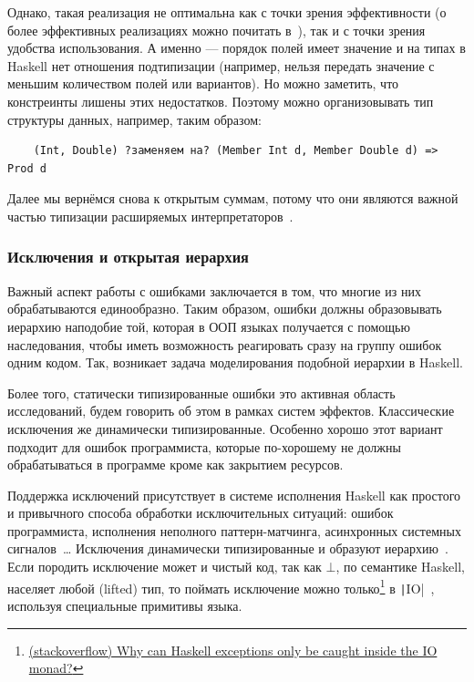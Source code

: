 Однако, такая реализация не оптимальна как с точки зрения эффективности (о более эффективных реализациях можно почитать в~\cite[глава 11]{maguire-types}), так и с точки зрения удобства использования.
А именно --- порядок полей имеет значение и на типах в Haskell нет отношения подтипизации (например, нельзя передать значение с меньшим количеством полей или вариантов).
Но можно заметить, что констреинты лишены этих недостатков.
Поэтому можно организовывать тип структуры данных, например, таким образом:
\begin{verbatim}
    (Int, Double) ?заменяем на? (Member Int d, Member Double d) => Prod d
\end{verbatim}

Далее мы вернёмся снова к открытым суммам, потому что они являются важной частью типизации расширяемых интерпретаторов~\cite{swierstra2008data}. %

\subsubsection{Исключения и открытая иерархия}

Важный аспект работы с ошибками заключается в том, что многие из них обрабатываются единообразно.
Таким образом, ошибки должны образовывать иерархию наподобие той, которая в ООП языках получается с помощью наследования, чтобы иметь возможность реагировать сразу на группу ошибок одним кодом.
Так, возникает задача моделирования подобной иерархии в Haskell.

Более того, статически типизированные ошибки это активная область исследований, будем говорить об этом в рамках систем эффектов. %
Классические исключения же динамически типизированные.
Особенно хорошо этот вариант подходит для ошибок программиста, которые по-хорошему не должны обрабатываться в программе кроме как закрытием ресурсов. %

Поддержка исключений присутствует в системе исполнения Haskell как простого и привычного способа обработки исключительных ситуаций: ошибок программиста, исполнения неполного паттерн-матчинга, асинхронных системных сигналов~\cite{marlow2001asynchronous}\ldots
Исключения динамически типизированные и образуют иерархию~\cite{marlow2006extensible}.
Если породить исключение может и чистый код, так как $\bot$, по семантике Haskell, населяет любой (lifted) тип, то поймать исключение можно только\footnote{\href{https://stackoverflow.com/questions/3642793/why-can-haskell-exceptions-only-be-caught-inside-the-io-monad}{(stackoverflow) Why can Haskell exceptions only be caught inside the IO monad?}} в \texttt|IO|~\cite{jones2001tackling}, используя специальные примитивы языка.


